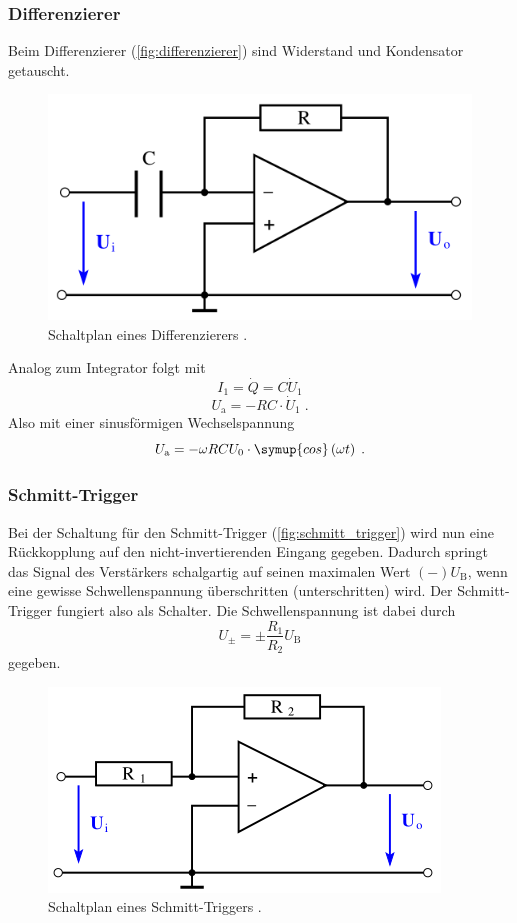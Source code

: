 \subsubsection{Differenzierer}
Beim Differenzierer (\autoref{fig:differenzierer}) sind Widerstand und Kondensator getauscht.
\begin{figure}
    \centering
    \includegraphics[width = .5\textwidth]{"content/pics/differenzierer.png"}
    \caption{Schaltplan eines Differenzierers \cite{v51}.}
    \label{fig:differenzierer}
\end{figure}
Analog zum Integrator folgt mit 
\begin{equation*}
    I_1 = \dot{Q} = C \dot{U}_1
\end{equation*}
\begin{equation}
    U_\text{a} = -RC \cdot \dot{U}_1 \;.
    \label{eq:differenzierer1}
\end{equation}
Also mit einer sinusförmigen Wechselspannung
\begin{equation}
    U_\text{a} = -\omega RC U_0 \cdot \symup{cos}\left(\omega t\right) \;.
    \label{eq:differenzierer2}
\end{equation}
\subsubsection{Schmitt-Trigger}
Bei der Schaltung für den Schmitt-Trigger (\autoref{fig:schmitt_trigger}) wird nun eine Rückkopplung auf den nicht-invertierenden Eingang gegeben.
Dadurch springt das Signal des Verstärkers schalgartig auf seinen maximalen Wert $(-) U_\text{B}$, wenn eine gewisse Schwellenspannung überschritten (unterschritten) wird.
Der Schmitt-Trigger fungiert also als Schalter.
Die Schwellenspannung ist dabei durch 
\begin{equation}
    U_{\pm} = \pm \frac{R_1}{R_2} U_\text{B}
    \label{eq:schmitt_trigger}
\end{equation}
gegeben.
\begin{figure}
    \centering
    \includegraphics[width = .5\textwidth]{"content/pics/schmitt_trigger.png"}
    \caption{Schaltplan eines Schmitt-Triggers \cite{v51}.}
    \label{fig:schmitt_trigger}
\end{figure}

